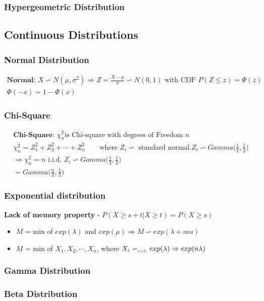 \subsubsection*{Hypergeometric Distribution}
\subsection*{Continuous Distributions}
\subsubsection*{Normal Distribution}
\begin{gather*}
	\textbf{Normal: } X \backsim N(\mu, \sigma^2) \Rightarrow Z = \frac{X- \mu}{\sigma} \backsim N(0,1) \text{ with CDF } P(Z \leq z) = \Phi(z)\\
	\Phi(-x) = 1 - \Phi(x) 
\end{gather*}
\subsubsection*{Chi-Square}
\begin{gather*}
	\textbf{Chi-Square: } \chi^2_n \text{is Chi-square with degrees of Freedom }n\\
	\chi^2_n = Z_1^2 + Z_2^2 + \cdots + Z_n^2 \quad \quad \text{where $Z_i \backsim$ standard normal}. Z_i \backsim Gamma\bigg(\frac{1}{2},\frac{1}{2}\bigg)\\
	\Rightarrow \chi^2_n = n \text{ i.i.d. } Z_i \backsim Gamma\bigg(\frac{1}{2},\frac{1}{2}\bigg)\\
	= Gamma\bigg(\frac{n}{2},\frac{1}{2}\bigg)
\end{gather*}
\subsubsection*{Exponential distribution}
\textbf{Lack of memory property} - $P(X \geq s+t | X\geq t) = P(X \geq s)$
\begin{itemize}
	\item $M$ = min of $exp(\lambda)$ and $exp(\mu) \Rightarrow M \backsim exp(\lambda + mu)$
	\item $M$ = min of $X_1, X_2, \cdots, X_n$, where $X_i \backsim_{\text{\tiny i.i.d.}} exp(\lambda) \Rightarrow exp(n\lambda)$ 
\end{itemize}
\subsubsection*{Gamma Distribution}
\subsubsection*{Beta Distribution}

